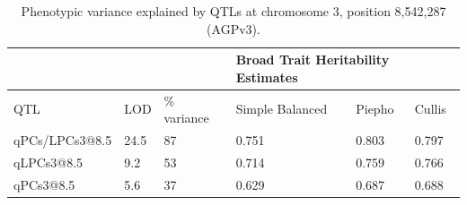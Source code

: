 \documentclass[9pt,twocolumn,twoside,lineno]{BioRxiv}
\begin{document}
\clearpage


\begin{table}[h!]
\begin{tabular}{@{}llllll@{}}
\toprule
               &      &             & \multicolumn{3}{l}{Broad Trait Heritability Estimates} \\ \midrule
QTL            & LOD  & \% variance & Simple Balanced        & Piepho        & Cullis        \\
qPCs/LPCs3@8.5 & 24.5 & 87          & 0.751                  & 0.803         & 0.797           \\
qLPCs3@8.5     & 9.2  & 53          & 0.714                  & 0.759         & 0.766         \\
qPCs3@8.5      & 5.6  & 37          & 0.629                  & 0.687         & 0.688         \\ \bottomrule
\end{tabular}
\label{tab:table2}
\caption{ Phenotypic variance explained by QTLs at chromosome 3, position 8,542,287 (AGPv3).}
\end{table}

\clearpage

\renewcommand{\thefigure}{Supplementary Figure \arabic{figure}}
\renewcommand{\thetable}{S\arabic{table}}%

\setcounter{figure}{0}
\setcounter{table}{0}
\end{document}

